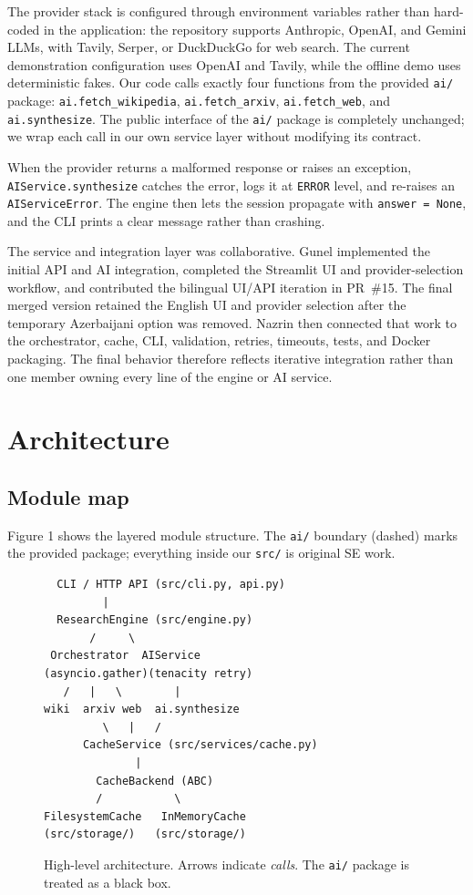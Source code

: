 \documentclass[11pt,a4paper]{article}
\begin{document}
The provider stack is configured through environment variables rather than hard-coded in the application: the repository supports Anthropic, OpenAI, and Gemini LLMs, with Tavily, Serper, or DuckDuckGo for web search. The current demonstration configuration uses OpenAI and Tavily, while the offline demo uses deterministic fakes. Our code calls exactly four functions from the provided \texttt{ai/} package: \texttt{ai.fetch\_wikipedia}, \texttt{ai.fetch\_arxiv}, \texttt{ai.fetch\_web}, and \texttt{ai.synthesize}. The public interface of the \texttt{ai/} package is completely unchanged; we wrap each call in our own service layer without modifying its contract.

When the provider returns a malformed response or raises an exception, \texttt{AIService.synthesize} catches the error, logs it at \texttt{ERROR} level, and re-raises an \texttt{AIServiceError}. The engine then lets the session propagate with \texttt{answer = None}, and the CLI prints a clear message rather than crashing.

The service and integration layer was collaborative. Gunel implemented the initial API and AI integration, completed the Streamlit UI and provider-selection workflow, and contributed the bilingual UI/API iteration in PR~\#15. The final merged version retained the English UI and provider selection after the temporary Azerbaijani option was removed. Nazrin then connected that work to the orchestrator, cache, CLI, validation, retries, timeouts, tests, and Docker packaging. The final behavior therefore reflects iterative integration rather than one member owning every line of the engine or AI service.

\section{Architecture}\label{sec:arch}

\subsection{Module map}

Figure 1 shows the layered module structure. The \texttt{ai/} boundary (dashed) marks the provided package; everything inside our \texttt{src/} is original SE work.

\begin{figure}[h]
\centering
\begin{verbatim}
  CLI / HTTP API (src/cli.py, api.py)
         |
  ResearchEngine (src/engine.py)
       /     \
 Orchestrator  AIService
(asyncio.gather)(tenacity retry)
   /   |   \        |
wiki  arxiv web  ai.synthesize
         \   |   /
      CacheService (src/services/cache.py)
              |
        CacheBackend (ABC)
        /           \
FilesystemCache   InMemoryCache
(src/storage/)   (src/storage/)
\end{verbatim}
\caption{High-level architecture. Arrows indicate \emph{calls}. The \texttt{ai/} package is treated as a black box.}
\label{fig:arch}
\end{figure}
\end{document}
